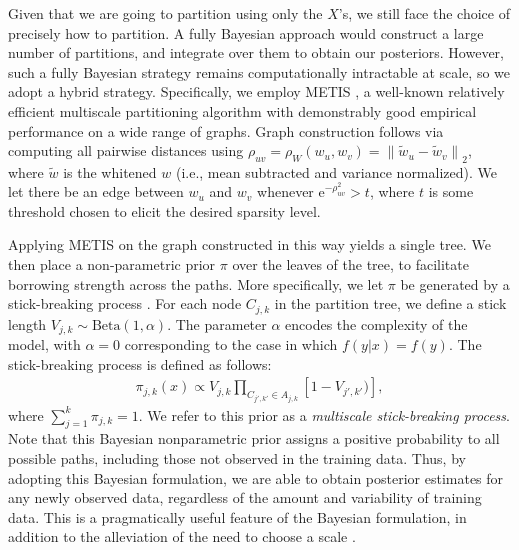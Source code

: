 \documentclass{article} %
\providecommand{\mt}[1]{\widetilde{#1}}
\providecommand{\norm}[1]{\left \lVert#1 \right  \rVert}
\begin{document}
	Given that we are going to partition using only the $X$'s, we still face the choice of precisely how to partition.  A fully Bayesian approach would construct a large number of partitions, and integrate over them to obtain our posteriors.  However, such a fully Bayesian strategy remains  computationally intractable at scale, so we adopt a hybrid strategy.  Specifically, we employ METIS \cite{METIS}, a well-known relatively efficient multiscale partitioning algorithm with demonstrably good empirical performance on a wide range of graphs.  Graph construction follows via computing all pairwise distances using $\rho_{uv}=\rho_W(w_u,w_v)=\norm{\mt{w}_u-\mt{w}_v}_2$, where $\mt{w}$ is the whitened $w$ (i.e., mean subtracted and variance normalized). We let there be an edge between $w_u$ and $w_v$ whenever  e$^{-\rho_{uv}^2} > t$, where $t$ is some threshold chosen to elicit the desired sparsity level.
	
	Applying METIS on the graph constructed in this way yields a single tree.  We then place a non-parametric prior $\pi$ over the leaves of the tree, to facilitate borrowing strength across the paths.  More specifically, we let $\pi$ be generated by a stick-breaking process \cite{stickbreaking}.  For each node $C_{j,k}$ in the partition tree, we define a stick length $V_{j,k} \sim \mbox{Beta}(1,\alpha)$.  The parameter $\alpha$ encodes the complexity of the model, with $\alpha=0$ corresponding to the case in which $f(y|x) = f(y)$. The stick-breaking process is defined as follows: 
	\begin{eqnarray*}
	\pi_{j,k}(x) \propto V_{j,k} \prod_{C_{j',k'} \in A_{j,k}} \left[1 - V_{j',k'}) \right],
	\end{eqnarray*}
	where  $\sum_{j=1}^k \pi_{j,k} = 1$.   We refer to this prior as a {\em multiscale stick-breaking process}. Note that this Bayesian nonparametric prior assigns a positive probability to all possible paths, including those not observed in the training data.  Thus, by adopting this Bayesian formulation, we are able to obtain posterior estimates for any newly observed data, regardless of the amount and variability of training data.  This is a pragmatically useful feature of the Bayesian formulation, in addition to the alleviation of the need to choose a scale \cite{ChenMaggioni12}.  %
\end{document}
